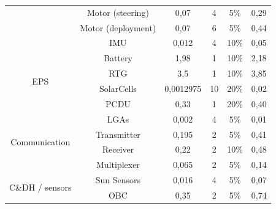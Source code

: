 \begin{table}[hbt]
{\begin{tabular}{@{}cccccc@{}}
                                        & Motor (steering)                    & 0,07                        & 4        & 5\%              & 0,29           \\
                                        & Motor (deployment)                  & 0,07                        & 6        & 5\%              & 0,44           \\
                                        & IMU                                 & 0,012                       & 4        & 10\%             & 0,05           \\ \midrule
\multirow{4}{*}{EPS}                    & Battery                             & 1,98                        & 1        & 10\%             & 2,18           \\
                                        & RTG                                 & 3,5                         & 1        & 10\%             & 3,85           \\
                                        & SolarCells                          & 0,0012975                   & 10       & 20\%             & 0,02           \\
                                        & PCDU                                & 0,33                        & 1        & 20\%             & 0,40           \\ \midrule
\multirow{4}{*}{Communication}          & LGAs                                & 0,002                       & 4        & 5\%              & 0,01           \\ 
                                        & Transmitter                         & 0,195                       & 2        & 5\%              & 0,41           \\
                                        & Receiver                            & 0,22                        & 2        & 10\%             & 0,48           \\
                                        & Multiplexer                         & 0,065                       & 2        & 5\%              & 0,14           \\\midrule
\multirow{4}{*}{C\&DH / sensors}        & Sun Sensors                         & 0,016                       & 4        & 5\%              & 0,07           \\
                                        & OBC                                 & 0,35                        & 2        & 5\%              & 0,74           \\

\end{tabular}}
\end{table}
